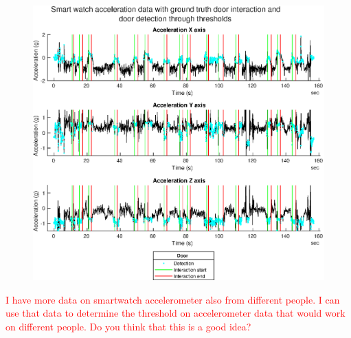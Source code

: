 \begin{figure}[H]
	\centering
	\includegraphics[width=0.7\linewidth]{images/20201114_1820_smartwatch_acc_with_gt_door_and_door_detect_2}
	\caption{}
	\label{fig:202011141820smartwatchaccwithgtdooranddoordetect2}
\end{figure}

\textcolor{red}{I have more data on smartwatch accelerometer also from different people. I can use that data to determine the threshold on accelerometer data that would work on different people. Do you think that this is a good idea?}